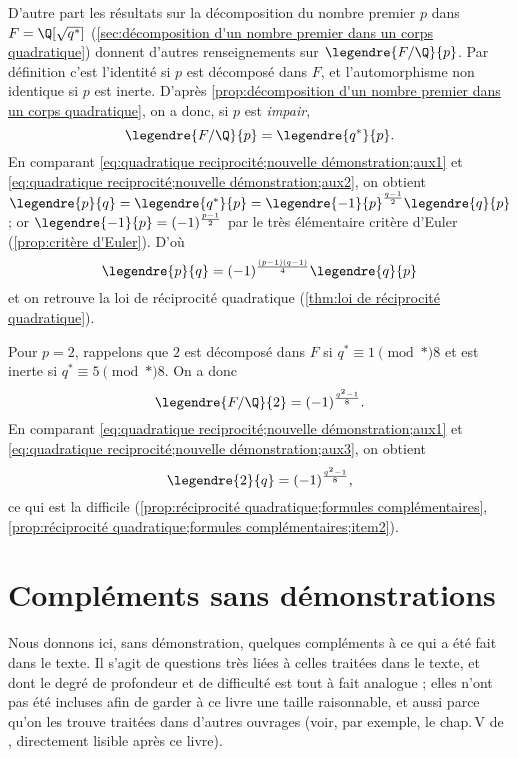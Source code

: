 \documentclass[11pt, useosf,
  title in boldface,
  theorem in new line,
  theorem numbering = section,
  number theorems separately,
]{simplivre}
\begin{document}
    D'autre part les résultats sur la décomposition du nombre premier \( p \) dans \( F = \Q[\sqrt{q^*}] \) (\cref{sec:décomposition d'un nombre premier dans un corps quadratique}) donnent d'autres renseignements sur \( \legendre{F/\Q}{p} \). Par définition c'est l'identité si \( p \) est décomposé dans \( F \), et l'automorphisme non identique si \( p \) est inerte. D'après \cref{prop:décomposition d'un nombre premier dans un corps quadratique}, on a donc, si \( p \) est \emph{impair},
    \begin{equation}\label{eq:quadratique reciprocité;nouvelle démonstration;aux2}
        \legendre{F/\Q}{p} = \legendre{q^*}{p}.
    \end{equation}
    En comparant \eqref{eq:quadratique reciprocité;nouvelle démonstration;aux1} et \eqref{eq:quadratique reciprocité;nouvelle démonstration;aux2}, on obtient \( \legendre{p}{q} = \legendre{q^*}{p} = \legendre{-1}{p}^{\frac{q-1}{2}} \legendre{q}{p} \) ; or \( \legendre{-1}{p} = (-1)^{\frac{p-1}{2}} \) par le très élémentaire critère d'Euler (\cref{prop:critère d'Euler}). D'où
    \[
        \legendre{p}{q} = (-1)^{\frac{(p-1)(q-1)}{4}} \legendre{q}{p}
    \]
    et on retrouve la loi de réciprocité quadratique (\cref{thm:loi de réciprocité quadratique}).

    Pour \( p = 2 \), rappelons que \( 2 \) est décomposé dans \( F \) si \( q^* \equiv 1 \pmod*{8} \) et est inerte si \( q^* \equiv 5 \pmod*{8} \). On a donc
    \begin{equation}\label{eq:quadratique reciprocité;nouvelle démonstration;aux3}
        \legendre{F/\Q}{2} = (-1)^{\frac{q^2-1}{8}}.
    \end{equation}
    En comparant \eqref{eq:quadratique reciprocité;nouvelle démonstration;aux1} et \eqref{eq:quadratique reciprocité;nouvelle démonstration;aux3}, on obtient
    \[
        \legendre{2}{q} = (-1)^{\frac{q^2-1}{8}},
    \]
    ce qui est la  difficile (\cref{prop:réciprocité quadratique;formules complémentaires}, \ref{prop:réciprocité quadratique;formules complémentaires;item2}).



\cleardoublepage
{}
{}
\chapter*{Compléments sans démonstrations}

Nous donnons ici, sans démonstration, quelques compléments à ce qui a été fait dans le texte. Il s'agit de questions très liées à celles traitées dans le texte, et dont le degré de profondeur et de difficulté est tout à fait analogue ; elles n'ont pas été incluses afin de garder à ce livre une taille raisonnable, et aussi parce qu'on les trouve traitées dans d'autres ouvrages (voir, par exemple, le chap.\,V de \cite{zariski1958}, directement lisible après ce livre).
\end{document}

